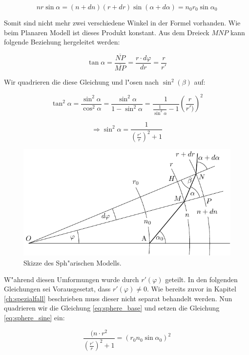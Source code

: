 \begin{refsection}
\begin{equation} \label{eq:sphere_base}
n r \sin \alpha = (n + dn)(r + dr) \sin (\alpha + d\alpha) = n_0 r_0 \sin \alpha_0
\end{equation}

Somit sind nicht mehr zwei verschiedene Winkel in der Formel vorhanden.
Wie beim Planaren Modell ist dieses Produkt konstant.  
Aus dem Dreieck $MNP$ kann folgende Beziehung hergeleitet werden:

$$\tan \alpha =  \frac{\overline{NP}}{\overline{MP}} = \frac{r \cdot d\varphi}{dr} = \frac{r}{r'}$$

Wir quadrieren die diese Gleichung und l"osen nach $\sin^2(\beta)$ auf:

$$\tan^2 \alpha = \frac{\sin^2\alpha}{\cos^2\alpha} = \frac{\sin^2\alpha}{1-\sin^2\alpha} = \frac{1}{\frac{1}{\sin^2\alpha}-1} \left( \frac{r}{r')} \right)^2$$

\begin{equation} \label{eq:sphere_sine}
\Rightarrow \sin^2\alpha = \frac{1}{\left( \frac{r'}{r} \right)^2 +1}
\end{equation}

\begin{figure} 
\centering
\includegraphics[scale=1]{licht/standalone/fig_sphere_skizze.pdf}
\caption{Skizze des Sph"arischen Modells. \label{fig:sphere_skizze}}
\end{figure}

W"ahrend diesen Umformungen wurde durch $r'(\varphi)$ geteilt. 
In den folgenden Gleichungen sei Vorausgesetzt, dass $r'(\varphi) \neq 0$. 
Wie bereits zuvor in Kapitel \ref{ch:spezialfall} beschrieben muss dieser nicht separat behandelt werden.
Nun quadrieren wir die Gleichung \ref{eq:sphere_base} und setzen die Gleichung \ref{eq:sphere_sine} ein:

$$\frac{(n \cdot r^2}{\left( \frac{r'}{r} \right)^2 +1} = (r_0 n_0 \sin \alpha_0)^2$$


\end{refsection}

